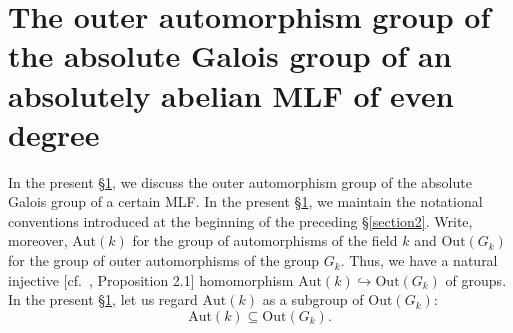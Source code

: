 \documentclass[12pt,showkeys]{amsart}
\theoremstyle{theorem}
\theoremstyle{definition}
\begin{document}
\section{The outer automorphism group of the absolute Galois group of an absolutely abelian MLF of even degree}\label{section3}

In the present \S \ref{section3}, we discuss the outer automorphism
group of the absolute Galois group of a certain MLF.  In the present
\S \ref{section3}, we maintain the notational conventions introduced
at the beginning of the preceding \S \ref{section2}.  Write, moreover, $\mathrm{Aut}(k)$ for the group of automorphisms of the field $k$ and $\mathrm{Out}(G_k)$ for the group of outer automorphisms of the group $G_k$.  Thus, we have a natural injective [cf.\ \cite{Hoshi1}, Proposition 2.1] homomorphism $\mathrm{Aut}(k) \hookrightarrow \mathrm{Out}(G_k)$ of groups.  In the present \S \ref{section3}, let us regard $\mathrm{Aut}(k)$ as a subgroup of $\mathrm{Out}(G_k)$:  
\[
\mathrm{Aut}(k) \subseteq \mathrm{Out}(G_k).  
\]
\end{document}
